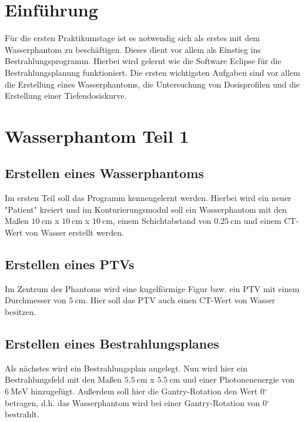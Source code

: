 
\section{Einführung}
\label{sec:Einfuehrung}
Für die ersten Praktikumstage ist es notwendig sich als erstes mit dem Wasserphantom zu beschäftigen. Dieses dient vor allem als Einstieg ins Bestrahlungsprogramm. Hierbei wird gelernt wie die Software Eclipse für die Bestrahlungsplanung funktioniert.  Die ersten wichtigsten Aufgaben sind vor allem die Erstellung eines Wasserphantoms, die Untersuchung von Dosisprofilen und  die Erstellung einer Tiefendosiskurve.


\section{Wasserphantom Teil 1}
\label{sec:Wasserphantom1}

\subsection{Erstellen eines Wasserphantoms}
\label{subsec:Erstellen}
Im ersten Teil soll das Programm kennengelernt werden.
Hierbei wird ein neuer "Patient" kreiert und im Konturierungsmodul soll ein Wasserphantom mit den Maßen $\SI{10}{\centi\meter}$ x $\SI{10}{\centi\meter}$ x $\SI{10}{\centi\meter}$, einem Schichtabstand von $\SI{0.25}{\centi\meter}$ und einem CT-Wert von Wasser erstellt werden.

\subsection{Erstellen eines PTVs}
\label{subsec:ErstellenPTV}
Im Zentrum des Phantoms wird eine kugelförmige Figur bzw. ein PTV mit einem Durchmesser von $\SI{5}{\centi\meter}$. Hier soll das PTV auch einen CT-Wert von Wasser besitzen.

\subsection{Erstellen eines Bestrahlungsplanes}
\label{subsec:Erstellenbestrahlung}
Als nächstes wird ein Bestrahlungsplan angelegt. Nun wird hier ein Bestrahlungsfeld mit den Maßen $\SI{5,5}{\centi\meter}$ x $\SI{5,5}{\centi\meter}$ und einer Photonenenergie von $\SI{6}{\mega\electronvolt}$ hinzugefügt. Außerdem soll hier die Gantry-Rotation den Wert 0$^\circ$ betragen, d.h. das Wasserphantom wird bei einer Gantry-Rotation von 0$^\circ$ bestrahlt.


